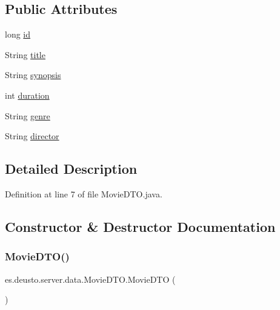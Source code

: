 \subsection*{Public Attributes}
\begin{DoxyCompactItemize}
\item 
long \mbox{\hyperlink{classes_1_1deusto_1_1server_1_1data_1_1_movie_d_t_o_a10965da25463f1f31f577279a8f42d88}{id}}
\item 
String \mbox{\hyperlink{classes_1_1deusto_1_1server_1_1data_1_1_movie_d_t_o_a09c5f5a8f9408f34e339e7149152839d}{title}}
\item 
String \mbox{\hyperlink{classes_1_1deusto_1_1server_1_1data_1_1_movie_d_t_o_a0d2474dd25e99046fdb05287ebd866b6}{synopsis}}
\item 
int \mbox{\hyperlink{classes_1_1deusto_1_1server_1_1data_1_1_movie_d_t_o_a0b00d6d86e21f93553c2d1fb1f5d846f}{duration}}
\item 
String \mbox{\hyperlink{classes_1_1deusto_1_1server_1_1data_1_1_movie_d_t_o_af613fe128f886f49ea14dcfbf57c5355}{genre}}
\item 
String \mbox{\hyperlink{classes_1_1deusto_1_1server_1_1data_1_1_movie_d_t_o_ace982fc1521c6e8fe3cf551f7bb85674}{director}}
\end{DoxyCompactItemize}


\subsection{Detailed Description}


Definition at line 7 of file Movie\+D\+T\+O.\+java.



\subsection{Constructor \& Destructor Documentation}
\mbox{\label{classes_1_1deusto_1_1server_1_1data_1_1_movie_d_t_o_a8dab5027de00475ceb896ad89af993b7}} 
\subsubsection{\texorpdfstring{MovieDTO()}{MovieDTO()}\hspace{0.1cm}{\footnotesize\ttfamily [1/2]}}
{\footnotesize\ttfamily es.\+deusto.\+server.\+data.\+Movie\+D\+T\+O.\+Movie\+D\+TO (\begin{DoxyParamCaption}{ }\end{DoxyParamCaption})}



